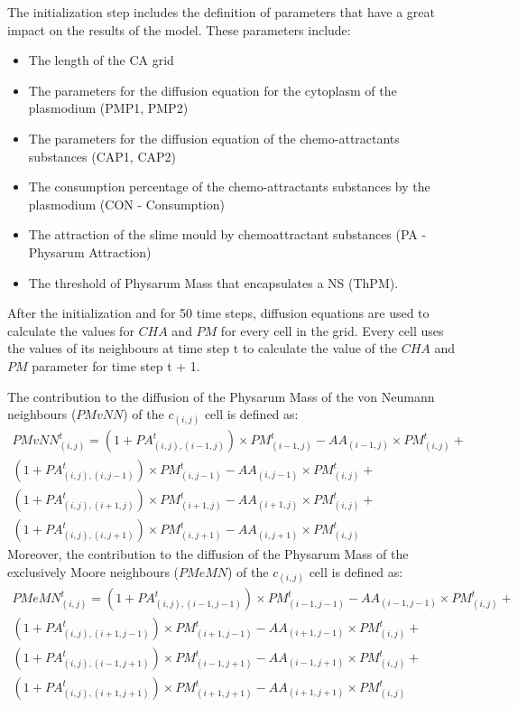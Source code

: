 \par
The initialization step includes the definition of parameters that have a great impact on the results of the model. These parameters include:
\begin{itemize}
	\item The length of the CA grid
	\item The parameters for the diffusion equation for the cytoplasm of the plasmodium (PMP1, PMP2)
	\item The parameters for the diffusion equation of the chemo-attractants substances (CAP1, CAP2)
	\item The consumption percentage of the chemo-attractants substances by the plasmodium (CON - Consumption)
	\item The attraction of the slime mould by chemoattractant substances (PA - Physarum Attraction)
	\item The threshold of Physarum Mass that encapsulates a NS (ThPM).
\end{itemize}

\par
After the initialization and for 50 time steps, diffusion equations are used to calculate the values for $CHA$ and $PM$ for every cell in the grid. Every cell uses the values of its neighbours at time step t to calculate the value of the $CHA$ and $PM$ parameter for time step t + 1. 

\par
The contribution to the diffusion of the Physarum Mass of the von Neumann neighbours ($PMvNN$) of the $c_{(i,j)}$ cell is defined as:
\begin{equation}
\begin{split}
PMvNN^t_{(i, j)} = 
(1 + PA^t_{(i, j),(i-1, j)}) \times PM^t_{(i-1, j)} - AA_{(i-1, j)} \times PM^t_{(i, j)} +
\\(1 + PA^t_{(i, j),(i, j-1)}) \times PM^t_{(i, j-1)} - AA_{(i, j-1)} \times PM^t_{(i, j)} +
\\(1 + PA^t_{(i, j),(i+1, j)}) \times PM^t_{(i+1, j)} - AA_{(i+1, j)} \times PM^t_{(i, j)}  +
\\(1 + PA^t_{(i, j),(i, j+1)}) \times PM^t_{(i, j+1)} - AA_{(i, j+1)} \times PM^t_{(i, j)}
\end{split}
\end{equation}
Moreover, the contribution to the diffusion of the Physarum Mass of the exclusively Moore neighbours ($PMeMN$) of the $c_{(i,j)}$ cell is defined as:
\begin{equation}
\begin{split}
PMeMN^t_{(i, j)} = 
(1 + PA^t_{(i, j),(i-1, j-1)}) \times PM^t_{(i-1, j-1)} - AA_{(i-1, j-1)} \times PM^t_{(i, j)} +
\\(1 + PA^t_{(i, j),(i+1, j-1)}) \times PM^t_{(i+1, j-1)} - AA_{(i+1, j-1)} \times PM^t_{(i, j)} +
\\(1 + PA^t_{(i, j),(i-1, j+1)}) \times PM^t_{(i-1, j+1)} - AA_{(i-1, j+1)} \times PM^t_{(i, j)}  +
\\(1 + PA^t_{(i, j),(i+1, j+1)}) \times PM^t_{(i+1, j+1)} - AA_{(i+1, j+1)} \times PM^t_{(i, j)}
\end{split}
\end{equation}

